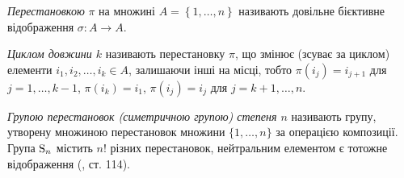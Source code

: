 \begin{definition}
    \emph{Перестановкою} $\pi$ на множині $A = \left\{1,\dots,n\right\}$
    називають довільне бієктивне відображення $\sigma: A \to A$.
\end{definition}
\begin{definition}
    \emph{Циклом довжини $k$} називають перестановку $\pi$, що змінює
    (зсуває за циклом) елементи $i_1, i_2, \dots, i_k \in A$, залишаючи
    інші на місці, тобто $\pi(i_{j}) = i_{j+1}$ для $j=1,\dots,k-1$,
    $\pi(i_k) = i_1$, $\pi(i_j) = i_j$ для $j = k+1, \dots, n$. 
\end{definition}
\begin{definition}
    \emph{Групою перестановок (симетричною групою) степеня $n$}
    називають групу, утворену множиною перестановок
    множини $\{1, \dots, n\}$ за операцією композиції.
    Група $\mathrm{S}_{n}$ містить $n!$ різних перестановок, нейтральним елементом є
    тотожне відображення (\cite{Spectorsky}, ст. 114).
\end{definition}